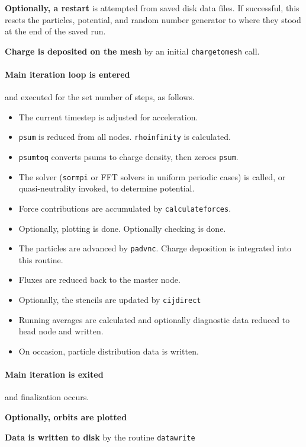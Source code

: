 \documentclass[12pt]{article}
\def\sentence#1{\par\noindent\textbf{#1}}
\begin{document}
\sentence{Optionally, a restart} is attempted from saved disk data
files. If successful, this resets the particles, potential, and random number
generator to where they stood at the end of the saved run.

\sentence{Charge is deposited on the mesh} by an initial \verb!chargetomesh! call.

\paragraph{Main iteration loop is entered} and executed for the set
number of steps, as follows.
\begin{itemize}\itemsep=0pt
\item The current timestep is adjusted for acceleration.
\item \verb!psum! is reduced from all nodes. \verb!rhoinfinity! is calculated.
\item \verb!psumtoq! converts psums to charge density, then zeroes \verb!psum!.
\item The solver (\verb!sormpi! or FFT solvers in uniform periodic
  cases) is called, or quasi-neutrality invoked, to determine
  potential.
\item Force contributions are accumulated by \verb!calculateforces!.
\item Optionally, plotting is done. Optionally checking is done.
\item The particles are advanced by \verb!padvnc!. Charge deposition
is integrated into this routine.
\item Fluxes are reduced back to the master node.
\item Optionally, the stencils are updated by \verb!cijdirect!
\item Running averages are calculated and optionally diagnostic data
  reduced to head node and written. 
\item On occasion, particle distribution data is written. 
\end{itemize}


\paragraph{Main iteration is exited} and finalization occurs.

\sentence{Optionally, orbits are plotted}

\sentence{Data is written to disk} by the routine \verb!datawrite!
\end{document}
